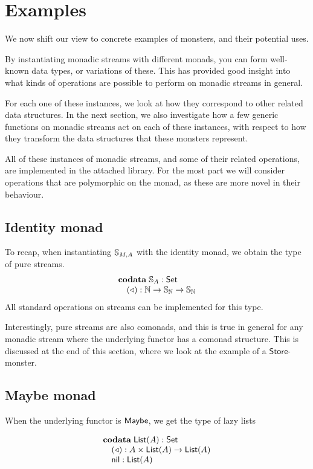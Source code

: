 \section{Examples}

We now shift our view to concrete examples of monsters, and their potential uses.

By instantiating monadic streams with different monads, you can form well-known data types, or variations of these. This has provided good insight into what kinds of operations are possible to perform on monadic streams in general.

For each one of these instances, we look at how they correspond to other related data structures. In the next section, we also investigate how a few generic functions on monadic streams act on each of these instances, with respect to how they transform the data structures that these monsters represent.

All of these instances of monadic streams, and some of their related operations, are implemented in the attached library. For the most part we will consider operations that are polymorphic on the monad, as these are more novel in their behaviour.

\subsection{Identity monad}

To recap, when instantiating $\mathbb{S}_{M,A}$ with the identity monad, we obtain the type of pure streams.
$$
\begin{array}[t]{l}
\mathbf{codata}\;
\mathbb{S}_{A}:\mathsf{Set}\\
\quad (\triangleleft): \mathbb{N}\rightarrow \mathbb{S}_{\mathbb{N}} \rightarrow\mathbb{S}_{\mathbb{N}}
\end{array}
$$
All standard operations on streams can be implemented for this type.

Interestingly, pure streams are also comonads, and this is true in general for any monadic stream where the underlying functor has a comonad structure. This is discussed at the end of this section, where we look at the example of a $\mathsf{Store}$-monster.

\subsection{Maybe monad}

When the underlying functor is $\mathsf{Maybe}$, we get the type of lazy lists

$$
\begin{array}[t]{l}
\mathbf{codata}\;
\mathsf{List}(A):\mathsf{Set}\\
\quad (\triangleleft): A\times \mathsf{List}(A)\rightarrow\mathsf{List}(A)\\
\quad \mathsf{nil}: \mathsf{List}(A)
\end{array}
$$

